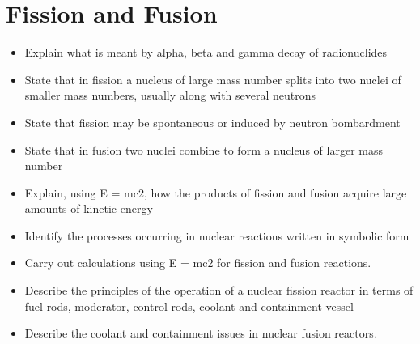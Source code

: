 \section{Fission and Fusion}
\begin{multicols}{2}
	\begin{itemize}
        \item Explain what is meant by alpha, beta and gamma decay of
            radionuclides

        \item State that in fission a nucleus of large mass number splits into 
            two nuclei of smaller mass numbers, usually along with several 
            neutrons

        \item State that fission may be spontaneous or induced by neutron
            bombardment

        \item State that in fusion two nuclei combine to form a nucleus of 
            larger mass number

        \item Explain, using E = mc2, how the products of fission and fusion
            acquire large amounts of kinetic energy

        \item Identify the processes occurring in nuclear reactions written in
            symbolic form

        \item Carry out calculations using E = mc2 for fission and fusion 
            reactions.

        \item Describe the principles of the operation of a nuclear fission 
            reactor in terms of fuel rods, moderator, control rods, coolant and
            containment vessel

        \item Describe the coolant and containment issues in nuclear fusion
            reactors.
	\end{itemize}
\end{multicols}

